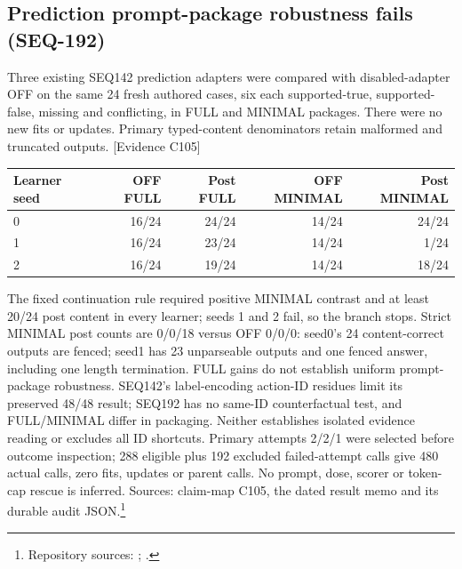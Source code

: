 \documentclass[11pt]{article}
\newcommand{\ev}[1]{\textsf{[Evidence #1]}}
\begin{document}
\subsection{Prediction prompt-package robustness fails (SEQ-192)}
\label{sec:seq192}
Three existing SEQ142 prediction adapters were compared with disabled-adapter
OFF on the same 24 fresh authored cases, six each supported-true,
supported-false, missing and conflicting, in FULL and MINIMAL packages.
There were no new fits or updates. Primary typed-content denominators retain
malformed and truncated outputs. \ev{C105}
\begin{center}
\begin{tabular}{lrrrr}
\toprule
Learner seed & OFF FULL & Post FULL & OFF MINIMAL & Post MINIMAL \\
\midrule
0 & 16/24 & 24/24 & 14/24 & 24/24 \\
1 & 16/24 & 23/24 & 14/24 & 1/24 \\
2 & 16/24 & 19/24 & 14/24 & 18/24 \\
\bottomrule
\end{tabular}
\end{center}
The fixed continuation rule required positive MINIMAL contrast and at least
20/24 post content in every learner; seeds 1 and 2 fail, so the branch stops.
Strict MINIMAL post counts are 0/0/18 versus OFF 0/0/0: seed0's 24
content-correct outputs are fenced; seed1 has 23 unparseable outputs and one
fenced answer, including one length termination. FULL gains do not establish
uniform prompt-package robustness. SEQ142's label-encoding action-ID residues
limit its preserved 48/48 result; SEQ192 has no same-ID counterfactual test,
and FULL/MINIMAL differ in packaging. Neither establishes isolated evidence
reading or excludes all ID shortcuts. Primary attempts 2/2/1 were selected
before outcome inspection; 288 eligible plus 192 excluded failed-attempt
calls give 480 actual calls, zero fits, updates or parent calls. No prompt,
dose, scorer or token-cap rescue is inferred. Sources: claim-map C105,
the dated result memo and its durable audit JSON.\footnote{Repository sources:
;
.}
\end{document}
